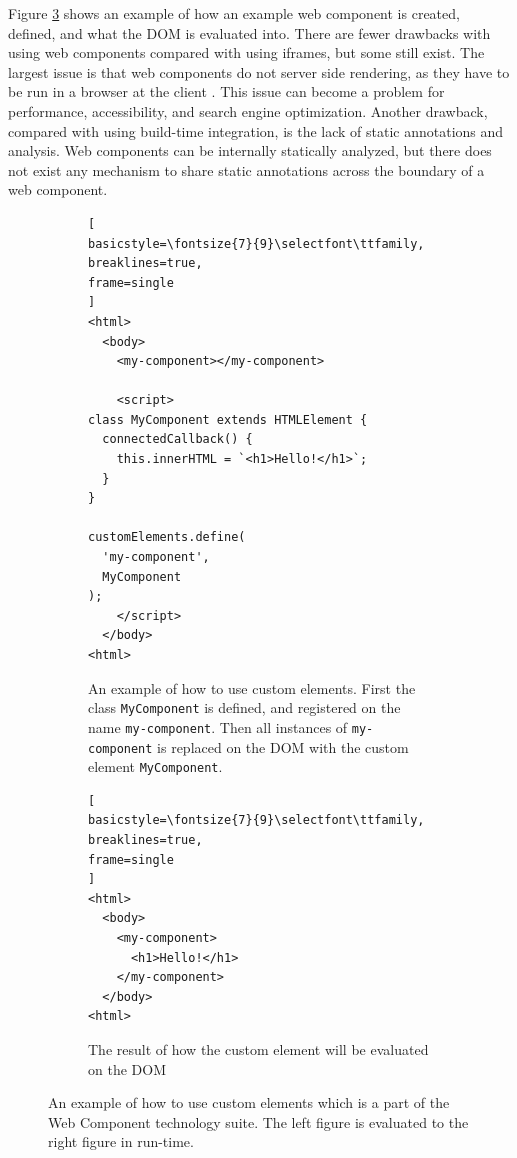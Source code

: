 Figure \ref{fig:web-components} shows an example of how an example web component is created, defined, and what the \ac{DOM} is evaluated into. There are fewer drawbacks with using web components compared with using iframes, but some still exist. The largest issue is that web components do not server side rendering, as they have to be run in a browser at the client \cite[ch.~5]{Geers2020}. This issue can become a problem for performance, accessibility, and search engine optimization. Another drawback, compared with using build-time integration, is the lack of static annotations and analysis. Web components can be internally statically analyzed, but there does not exist any mechanism to share static annotations across the boundary of a web component.

\begin{figure}
\centering
\begin{subfigure}{.65\linewidth}
  \centering
\begin{lstlisting}[
basicstyle=\fontsize{7}{9}\selectfont\ttfamily,
breaklines=true,
frame=single
]
<html>
  <body>
    <my-component></my-component>

    <script>
class MyComponent extends HTMLElement {
  connectedCallback() {
    this.innerHTML = `<h1>Hello!</h1>`;
  }
}

customElements.define(
  'my-component',
  MyComponent
);
    </script>
  </body>
<html>
\end{lstlisting}
  \caption{An example of how to use custom elements. First the class \texttt{MyComponent} is defined, and registered on the name \texttt{my-component}. Then all instances of \texttt{my-component} is replaced on the \ac{DOM} with the custom element \texttt{MyComponent}.}
  \label{fig:sub1}
\end{subfigure}
\hfill
\begin{subfigure}{.30\linewidth}
  \centering
\begin{lstlisting}[
basicstyle=\fontsize{7}{9}\selectfont\ttfamily,
breaklines=true,
frame=single
]
<html>
  <body>
    <my-component>
      <h1>Hello!</h1>
    </my-component>
  </body>
<html>
\end{lstlisting}
  \caption{The result of how the custom element will be evaluated on the \ac{DOM}}
  \label{fig:sub2}
\end{subfigure}
\caption{An example of how to use custom elements which is a part of the Web Component technology suite. The left figure is evaluated to the right figure in run-time.}
\label{fig:web-components}
\end{figure}

